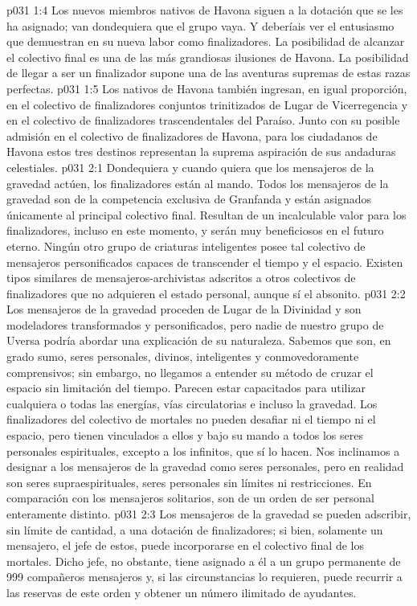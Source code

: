 \vs p031 1:4 Los nuevos miembros nativos de Havona siguen a la dotación que se les ha asignado; van dondequiera que el grupo vaya. Y deberíais ver el entusiasmo que demuestran en su nueva labor como finalizadores. La posibilidad de alcanzar el colectivo final es una de las más grandiosas ilusiones de Havona. La posibilidad de llegar a ser un finalizador supone una de las aventuras supremas de estas razas perfectas.
\vs p031 1:5 Los nativos de Havona también ingresan, en igual proporción, en el colectivo de finalizadores conjuntos trinitizados de Lugar de Vicerregencia y en el colectivo de finalizadores trascendentales del Paraíso. Junto con su posible admisión en el colectivo de finalizadores de Havona, para los ciudadanos de Havona estos tres destinos representan la suprema aspiración de sus andaduras celestiales.
\vs p031 2:1 Dondequiera y cuando quiera que los mensajeros de la gravedad actúen, los finalizadores están al mando. Todos los mensajeros de la gravedad son de la competencia exclusiva de Granfanda y están asignados únicamente al principal colectivo final. Resultan de un incalculable valor para los finalizadores, incluso en este momento, y serán muy beneficiosos en el futuro eterno. Ningún otro grupo de criaturas inteligentes posee tal colectivo de mensajeros personificados capaces de transcender el tiempo y el espacio. Existen tipos similares de mensajeros\hyp{}archivistas adscritos a otros colectivos de finalizadores que no adquieren el estado personal, aunque sí el absonito.
\vs p031 2:2 \pc Los mensajeros de la gravedad proceden de Lugar de la Divinidad y son modeladores transformados y personificados, pero nadie de nuestro grupo de Uversa podría abordar una explicación de su naturaleza. Sabemos que son, en grado sumo, seres personales, divinos, inteligentes y conmovedoramente comprensivos; sin embargo, no llegamos a entender su método de cruzar el espacio sin limitación del tiempo. Parecen estar capacitados para utilizar cualquiera o todas las energías, vías circulatorias e incluso la gravedad. Los finalizadores del colectivo de mortales no pueden desafiar ni el tiempo ni el espacio, pero tienen vinculados a ellos y bajo su mando a todos los seres personales espirituales, excepto a los infinitos, que sí lo hacen. Nos inclinamos a designar a los mensajeros de la gravedad como seres personales, pero en realidad son seres supraespirituales, seres personales sin límites ni restricciones. En comparación con los mensajeros solitarios, son de un orden de ser personal enteramente distinto.
\vs p031 2:3 \pc Los mensajeros de la gravedad se pueden adscribir, sin límite de cantidad, a una dotación de finalizadores; si bien, solamente un mensajero, el jefe de estos, puede incorporarse en el colectivo final de los mortales. Dicho jefe, no obstante, tiene asignado a él a un grupo permanente de 999 compañeros mensajeros y, si las circunstancias lo requieren, puede recurrir a las reservas de este orden y obtener un número ilimitado de ayudantes.
